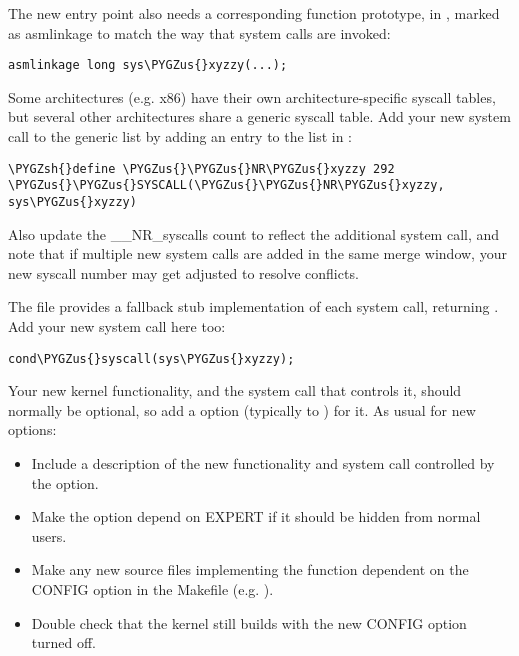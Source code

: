 \documentclass[a4paper,8pt,english]{sphinxmanual}
\def\PYGZus{\char`\_}
\def\PYGZsh{\char`\#}
\begin{document}
The new entry point also needs a corresponding function prototype, in
, marked as asmlinkage to match the way that system
calls are invoked:

\begin{Verbatim}[commandchars=\\\{\}]
asmlinkage long sys\PYGZus{}xyzzy(...);
\end{Verbatim}

Some architectures (e.g. x86) have their own architecture-specific syscall
tables, but several other architectures share a generic syscall table. Add your
new system call to the generic list by adding an entry to the list in
:

\begin{Verbatim}[commandchars=\\\{\}]
\PYGZsh{}define \PYGZus{}\PYGZus{}NR\PYGZus{}xyzzy 292
\PYGZus{}\PYGZus{}SYSCALL(\PYGZus{}\PYGZus{}NR\PYGZus{}xyzzy, sys\PYGZus{}xyzzy)
\end{Verbatim}

Also update the \_\_NR\_syscalls count to reflect the additional system call, and
note that if multiple new system calls are added in the same merge window,
your new syscall number may get adjusted to resolve conflicts.

The file  provides a fallback stub implementation of each
system call, returning .  Add your new system call here too:

\begin{Verbatim}[commandchars=\\\{\}]
cond\PYGZus{}syscall(sys\PYGZus{}xyzzy);
\end{Verbatim}

Your new kernel functionality, and the system call that controls it, should
normally be optional, so add a  option (typically to
) for it. As usual for new  options:
\begin{itemize}
\item {} 
Include a description of the new functionality and system call controlled
by the option.

\item {} 
Make the option depend on EXPERT if it should be hidden from normal users.

\item {} 
Make any new source files implementing the function dependent on the CONFIG
option in the Makefile (e.g. ).

\item {} 
Double check that the kernel still builds with the new CONFIG option turned
off.

\end{itemize}
\end{document}
